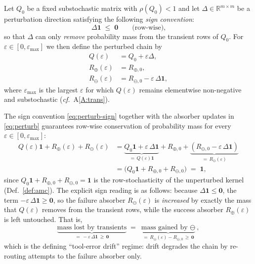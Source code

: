 \begin{definition}
\label{def:perturb}
Let $Q_0$ be a fixed substochastic matrix with $\rho(Q_0)<1$ and let
$\Delta\in\mathbb{R}^{m\times m}$ be a perturbation direction satisfying
the following \emph{sign convention}:
\begin{equation}
\Delta\mathbf{1}\;\le\;\mathbf{0}\qquad\text{(row-wise),}
\label{eq:perturb-sign}
\end{equation}
so that $\Delta$ can only \emph{remove} probability mass from the
transient rows of $Q_0$. For $\varepsilon\in[0,\varepsilon_{\max}]$ we
then define the perturbed chain by
\begin{equation}
\begin{aligned}
Q(\varepsilon) &= Q_0+\varepsilon\Delta, \\
R_{\oplus}(\varepsilon) &= R_{\oplus,0}, \\
R_{\ominus}(\varepsilon) &= R_{\ominus,0}-\varepsilon\,\Delta\mathbf{1},
\end{aligned}
\label{eq:perturb}
\end{equation}
where $\varepsilon_{\max}$ is the largest $\varepsilon$ for which
$Q(\varepsilon)$ remains elementwise non-negative and substochastic
(\textit{cf.}\ A\ref{A:trans}).
\end{definition}

\begin{remark}
\label{rem:perturb-mass}
The sign convention \eqref{eq:perturb-sign} together with the
absorber updates in \eqref{eq:perturb} guarantees row-wise conservation
of probability mass for every $\varepsilon\in[0,\varepsilon_{\max}]$:
\begin{equation}
\begin{aligned}
Q(\varepsilon)\mathbf{1}
  + R_\oplus(\varepsilon)
  + R_\ominus(\varepsilon)
&= \underbrace{Q_0\mathbf{1} + \varepsilon\,\Delta\mathbf{1}}_{=\,Q(\varepsilon)\mathbf{1}}
   + R_{\oplus,0}
   + \underbrace{(R_{\ominus,0}-\varepsilon\,\Delta\mathbf{1})}_{=\,R_\ominus(\varepsilon)} \\
&= \bigl(Q_0\mathbf{1}+R_{\oplus,0}+R_{\ominus,0}\bigr)
   \;=\; \mathbf{1},
\end{aligned}
\label{eq:perturb-conservation}
\end{equation}
since $Q_0\mathbf{1}+R_{\oplus,0}+R_{\ominus,0}=\mathbf{1}$ is the row-stochasticity
of the unperturbed kernel (Def.~\ref{def:amc}). The explicit sign
reading is as follows: because $\Delta\mathbf{1}\le\mathbf{0}$, the term
$-\varepsilon\,\Delta\mathbf{1}\ge\mathbf{0}$, so the failure absorber
$R_\ominus(\varepsilon)$ is \emph{increased} by exactly the mass that
$Q(\varepsilon)$ removes from the transient rows, while the success
absorber $R_\oplus(\varepsilon)$ is left untouched. That is,
\[
\underbrace{\text{mass lost by transients}}_{=\,-\varepsilon\,\Delta\mathbf{1}\,\ge\,\mathbf{0}}
  \;=\;
\underbrace{\text{mass gained by }\ominus}_{=\,R_\ominus(\varepsilon)-R_{\ominus,0}\,\ge\,\mathbf{0}},
\]
which is the defining ``tool-error drift'' regime: drift degrades the
chain by re-routing attempts to the failure absorber only.
\end{remark}


